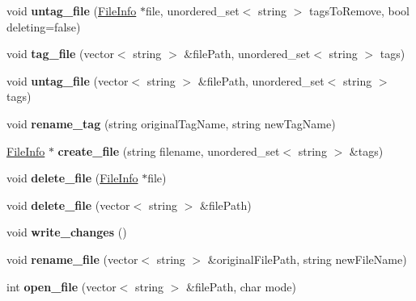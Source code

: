 \begin{DoxyCompactItemize}
void {\bfseries untag\+\_\+file} (\mbox{\hyperlink{classFileInfo}{File\+Info}} $\ast$file, unordered\+\_\+set$<$ string $>$ tags\+To\+Remove, bool deleting=false)
\item 
\mbox{\label{classFileSystem_a7d761ee2fa4d0c2965b5d3c7a75e7fdc}} 
void {\bfseries tag\+\_\+file} (vector$<$ string $>$ \&file\+Path, unordered\+\_\+set$<$ string $>$ tags)
\item 
\mbox{\label{classFileSystem_a0389071e782ad9972fbf599179d44c3e}} 
void {\bfseries untag\+\_\+file} (vector$<$ string $>$ \&file\+Path, unordered\+\_\+set$<$ string $>$ tags)
\item 
\mbox{\label{classFileSystem_aaaecc65bbba05c3ede2e6246915e35d1}} 
void {\bfseries rename\+\_\+tag} (string original\+Tag\+Name, string new\+Tag\+Name)
\item 
\mbox{\label{classFileSystem_a2725ca065d28de5650e8368270743614}} 
\mbox{\hyperlink{classFileInfo}{File\+Info}} $\ast$ {\bfseries create\+\_\+file} (string filename, unordered\+\_\+set$<$ string $>$ \&tags)
\item 
\mbox{\label{classFileSystem_a2718456ead4a9e7244c33d4a86cb844c}} 
void {\bfseries delete\+\_\+file} (\mbox{\hyperlink{classFileInfo}{File\+Info}} $\ast$file)
\item 
\mbox{\label{classFileSystem_a5620f645c0e25ade03f14ae81432654c}} 
void {\bfseries delete\+\_\+file} (vector$<$ string $>$ \&file\+Path)
\item 
\mbox{\label{classFileSystem_a02953b33b71137de70b8c8e48c59ff77}} 
void {\bfseries write\+\_\+changes} ()
\item 
\mbox{\label{classFileSystem_a466ab4fcc5f4aeba5131c8700e006d4c}} 
void {\bfseries rename\+\_\+file} (vector$<$ string $>$ \&original\+File\+Path, string new\+File\+Name)
\item 
\mbox{\label{classFileSystem_a661ae7deb6fb32cdd7d631dfadb8c983}} 
int {\bfseries open\+\_\+file} (vector$<$ string $>$ \&file\+Path, char mode)
\item 

\end{DoxyCompactItemize}

